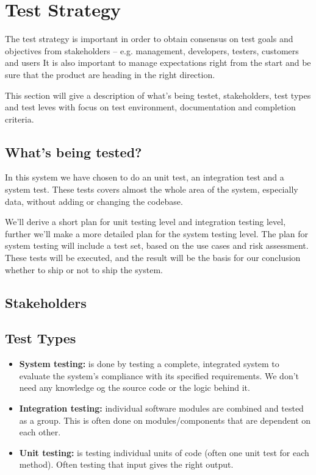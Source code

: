\chapter{Test Strategy}


	The test strategy is important in order to obtain consensus on test goals and objectives from stakeholders – e.g. management, developers, testers, customers and users It is also important to manage expectations right from the start and be sure that the product are heading in the right direction.

	This section will give a description of what's being testet, stakeholders, test types and test leves with focus on test environment, documentation and completion criteria.

	\clearpage

	\section{What’s being tested?}

		In this system we have chosen to do  an unit test, 
		an integration test and a system test. 
		These tests covers almost the whole area of the system, especially data, without adding 
		or changing the codebase.

		We’ll derive a short plan for unit testing level and integration testing level, further 
		we’ll make a more detailed plan for the system testing level. The plan for system testing 
		will include a test set, based on the use cases and risk assessment. These tests will be 
		executed, and the result will be the basis for our conclusion whether to ship or not to 
		ship the system.

	\section{Stakeholders}



	\section {Test Types}

		\begin{itemize}
			\item {\bf System testing:} is done by testing a complete, integrated system to 
			evaluate the system's compliance with its specified requirements. We don’t need 
			any knowledge og the source code or the logic behind it.
			\item {\bf Integration testing:} individual software modules are combined and tested as a group. 
			This is often done on modules/components that are dependent on each other. 
			\item {\bf Unit testing:} is testing individual units of code (often one unit test for each method). 
			Often testing that input gives the right output. 
		\end{itemize}

